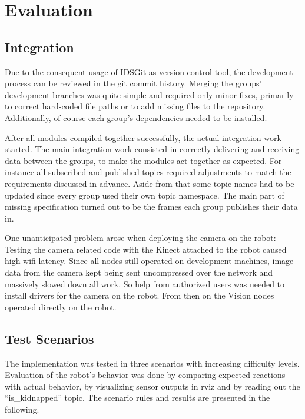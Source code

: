 \chapter{Evaluation}
\label{Evaluation chapter}
\section{Integration}
Due to the consequent usage of IDSGit as version control tool, the development process can be reviewed in the git commit history. Merging the groups' development branches was quite simple and required only minor fixes, primarily to correct hard-coded file paths or to add missing files to the repository. Additionally, of course each group's dependencies needed to be installed.

After all modules compiled together successfully, the actual integration work started. The main integration work consisted in correctly delivering and receiving data between the groups, to make the modules act together as expected. For instance all subscribed and published topics required adjustments to match the requirements discussed in advance. Aside from that some topic names had to be updated since every group used their own topic namespace. The main part of missing specification turned out to be the frames each group publishes their data in.

One unanticipated problem arose when deploying the camera on the robot: Testing the camera related code with the Kinect attached to the robot caused high wifi latency. Since all nodes still operated on development machines, image data from the camera kept being sent uncompressed over the network and massively slowed down all work. So help from authorized users was needed to install drivers for the camera on the robot. From then on the Vision nodes operated directly on the robot.

\section{Test Scenarios}
The implementation was tested in three scenarios with increasing difficulty levels. Evaluation of the robot's behavior was done by comparing expected reactions with actual behavior, by visualizing sensor outputs in rviz and by reading out the ``is\_kidnapped'' topic. The scenario rules and results are presented in the following.

